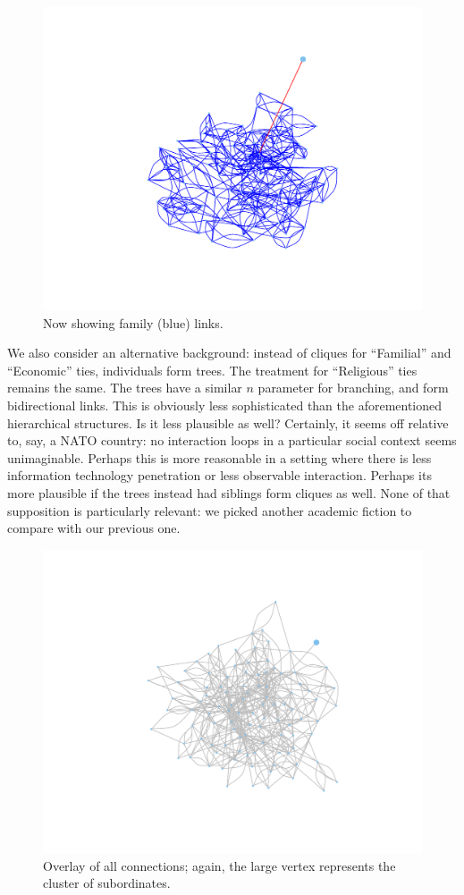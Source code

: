 \documentclass{article}
\newenvironment{rnwfig}[0]{\begin{figure}\begin{center}}{\end{center}\end{figure}}
\begin{document}
\begin{rnwfig}
\includegraphics{manuscript-family}
\caption{Now showing family (blue) links.}
\end{rnwfig}

We also consider an alternative background: instead of cliques for ``Familial'' and ``Economic'' ties, individuals form trees.  The treatment for ``Religious'' ties remains the same.  The trees have a similar $n$ parameter for branching, and form bidirectional links.  This is obviously less sophisticated than the aforementioned hierarchical structures.  Is it less plausible as well?  Certainly, it seems off relative to, say, a NATO country: no interaction loops in a particular social context seems unimaginable.  Perhaps this is more reasonable in a setting where there is less information technology penetration or less observable interaction.  Perhaps its more plausible if the trees instead had siblings form cliques as well.  None of that supposition is particularly relevant: we picked another academic fiction to compare with our previous one.


\begin{rnwfig}
\includegraphics{manuscript-allAlt}
\caption{Overlay of all connections; again, the large vertex represents the cluster of subordinates.}
\end{rnwfig}
\end{document}

